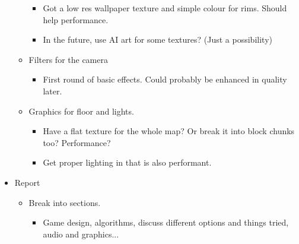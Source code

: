 \begin{itemize}
\begin{itemize}
        \begin{itemize}
            \item Got a low res wallpaper texture and simple colour for rims. Should help performance.
            \item In the future, use AI art for some textures? (Just a possibility)
        \end{itemize}
        \item Filters for the camera
        \begin{itemize}
            \item First round of basic effects. Could probably be enhanced in quality later.
        \end{itemize}
        \item Graphics for floor and lights.
        \begin{itemize}
            \item Have a flat texture for the whole map? Or break it into block chunks too? Performance?
            \item Get proper lighting in that is also performant.
        \end{itemize}
    \end{itemize}
    \item Report
    \begin{itemize}
        \item Break into sections.
        \begin{itemize}
            \item Game design, algorithms, discuss different options and things tried, audio and graphics...
        \end{itemize}
    \end{itemize}
\end{itemize}
